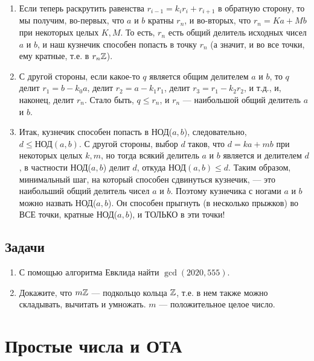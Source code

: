 \begin{enumerate}
\item Если теперь раскрутить равенства $r_{i-1}=k_ir_i+r_{i+1}$ в обратную сторону, то мы получим, во-первых, что $a$ и $b$ кратны $r_n$, и во-вторых, что $r_n=Ka+Mb$ при некоторых целых $K,M$. То есть, $r_n$ есть общий делитель исходных чисел $a$ и $b$, и наш кузнечик способен попасть в точку $r_n$ (а значит, и во все точки, ему кратные, т.е. в $r_n\mathbb Z$).
\item С другой стороны, если какое-то $q$ является общим делителем $a$ и $b$, то $q$ делит $r_1=b-k_0a$, делит $r_2=a-k_1r_1$, делит $r_3=r_1-k_2r_2$, и т.д., и, наконец, делит $r_n$. Стало быть, $q\le r_n$, и $r_n$ --- наибольшой общий делитель $a$ и $b$.
\item Итак, кузнечик способен попасть в НОД($a,b$), следовательно, $d\le\mbox{НОД}(a,b)$. С другой стороны, выбор $d$ таков, что $d=ka+mb$ при некоторых целых $k,m$, но тогда всякий делитель $a$ и $b$ является и делителем $d$, в частности НОД($a,b$) делит $d$, откуда $\mbox{НОД}(a,b)\le d$. Таким образом, минимальный шаг, на который способен сдвинуться кузнечик, --- это наибольший общий делитель чисел $a$ и $b$. Поэтому кузнечика с ногами $a$ и $b$ можно назвать НОД($a,b$). Он способен прыгнуть (в несколько прыжков) во ВСЕ точки, кратные НОД($a,b$), и ТОЛЬКО в эти точки!
\end{enumerate}
\subsection*{Задачи}
\begin{enumerate}
\item С помощью алгоритма Евклида найти $\gcd(2020,555)$.
\item Докажите, что $m\mathbb Z$ --- подкольцо кольца $\mathbb Z$, т.е. в нем также можно складывать, вычитать и умножать. $m$ --- положительное целое число.
\end{enumerate}


\section{Простые числа и ОТА}\label{PrimeNumbers}


